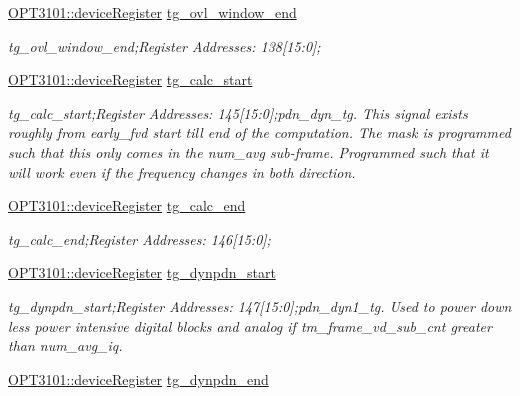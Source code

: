 \begin{DoxyCompactItemize}
\mbox{\hyperlink{class_o_p_t3101_1_1device_register}{O\+P\+T3101\+::device\+Register}} \mbox{\hyperlink{class_o_p_t3101_1_1registers_afde33d8e7e972a532373fabf602af1e2}{tg\+\_\+ovl\+\_\+window\+\_\+end}}
\begin{DoxyCompactList}\small\item\em tg\+\_\+ovl\+\_\+window\+\_\+end;Register Addresses\+: 138\mbox{[}15\+:0\mbox{]}; \end{DoxyCompactList}\item 
\mbox{\hyperlink{class_o_p_t3101_1_1device_register}{O\+P\+T3101\+::device\+Register}} \mbox{\hyperlink{class_o_p_t3101_1_1registers_ab1ac2d988d3463d49c708505b9d10e38}{tg\+\_\+calc\+\_\+start}}
\begin{DoxyCompactList}\small\item\em tg\+\_\+calc\+\_\+start;Register Addresses\+: 145\mbox{[}15\+:0\mbox{]};pdn\+\_\+dyn\+\_\+tg. This signal exists roughly from early\+\_\+fvd start till end of the computation. The mask is programmed such that this only comes in the num\+\_\+avg sub-\/frame. Programmed such that it will work even if the frequency changes in both direction. \end{DoxyCompactList}\item 
\mbox{\hyperlink{class_o_p_t3101_1_1device_register}{O\+P\+T3101\+::device\+Register}} \mbox{\hyperlink{class_o_p_t3101_1_1registers_a853eb6fac21dd74584680fe828477be8}{tg\+\_\+calc\+\_\+end}}
\begin{DoxyCompactList}\small\item\em tg\+\_\+calc\+\_\+end;Register Addresses\+: 146\mbox{[}15\+:0\mbox{]}; \end{DoxyCompactList}\item 
\mbox{\hyperlink{class_o_p_t3101_1_1device_register}{O\+P\+T3101\+::device\+Register}} \mbox{\hyperlink{class_o_p_t3101_1_1registers_a8e552798736ae98ba96bc672fc5f46d4}{tg\+\_\+dynpdn\+\_\+start}}
\begin{DoxyCompactList}\small\item\em tg\+\_\+dynpdn\+\_\+start;Register Addresses\+: 147\mbox{[}15\+:0\mbox{]};pdn\+\_\+dyn1\+\_\+tg. Used to power down less power intensive digital blocks and analog if tm\+\_\+frame\+\_\+vd\+\_\+sub\+\_\+cnt greater than num\+\_\+avg\+\_\+iq. \end{DoxyCompactList}\item 
\mbox{\hyperlink{class_o_p_t3101_1_1device_register}{O\+P\+T3101\+::device\+Register}} \mbox{\hyperlink{class_o_p_t3101_1_1registers_a97c8582f0bd644163e48032cf137ffc2}{tg\+\_\+dynpdn\+\_\+end}}

\end{DoxyCompactItemize}
